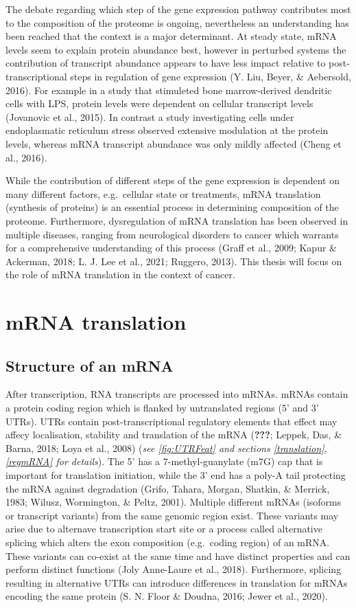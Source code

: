 \documentclass[12pt,openany]{book}
\begin{document}
The debate regarding which step of the gene expression pathway
contributes most to the composition of the proteome is ongoing,
nevertheless an understanding has been reached that the context is a
major determinant. At steady state, mRNA levels seem to explain protein
abundance best, however in perturbed systems the contribution of
transcript abundance appears to have less impact relative to
post-transcriptional steps in regulation of gene expression (Y. Liu,
Beyer, \& Aebersold, 2016). For example in a study that stimuleted bone
marrow-derived dendritic cells with LPS, protein levels were dependent
on cellular transcript levels (Jovanovic et al., 2015). In contrast a
study investigating cells under endoplasmatic reticulum stress observed
extensive modulation at the protein levels, whereas mRNA transcript
abundance was only mildly affected (Cheng et al., 2016).

While the contribution of different steps of the gene expression is
dependent on many different factors, e.g.~cellular state or treatments,
mRNA translation (synthesis of proteins) is an essential process in
determining composition of the proteome. Furthermore, dysregulation of
mRNA translation has been observed in multiple diseases, ranging from
neurological disorders to cancer which warrants for a comprehensive
understanding of this process (Graff et al., 2009; Kapur \& Ackerman,
2018; L. J. Lee et al., 2021; Ruggero, 2013). This thesis will focus on
the role of mRNA translation in the context of cancer. \newline
\section{mRNA translation} \subsection{Structure of an mRNA} After
transcription, RNA transcripts are processed into mRNAs. mRNAs contain a
protein coding region which is flanked by untranslated regions (5' and
3' UTRs). UTRs contain post-transcriptional regulatory elements that
effect may affecy localisation, stability and translation of the mRNA
({\textbf{???}}; Leppek, Das, \& Barna, 2018; Loya et al., 2008)
(\emph{see \ref{fig:UTRFeat} and sections
\ref{translation},\ref{regmRNA} for details}). The 5' has a
7-methyl-guanylate (m7G) cap that is important for translation
initiation, while the 3' end has a poly-A tail protecting the mRNA
against degradation (Grifo, Tahara, Morgan, Shatkin, \& Merrick, 1983;
Wilusz, Wormington, \& Peltz, 2001). Multiple different mRNAs (isoforms
or transcript variants) from the same genomic region exist. These
variants may arise due to alternave transcription start site or a
process called alternative splicing which alters the exon composition
(e.g.~coding region) of an mRNA. These variants can co-exist at the same
time and have distinct properties and can perform distinct functions
(Joly Anne-Laure et al., 2018). Furthermore, splicing resulting in
alternative UTRs can introduce differences in translation for mRNAs
encoding the same protein (S. N. Floor \& Doudna, 2016; Jewer et al.,
2020).
\end{document}
